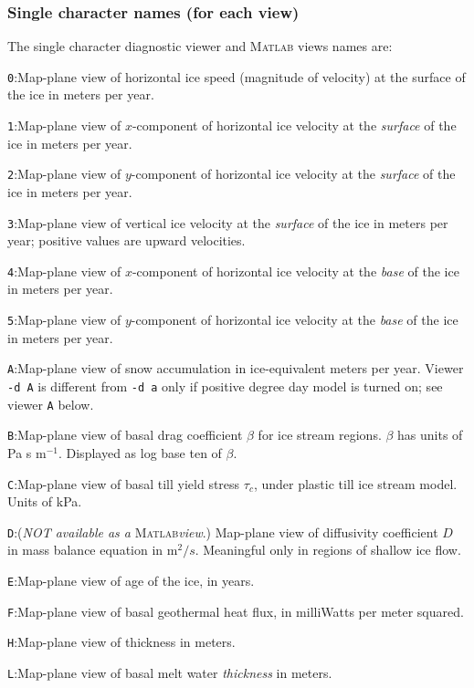 \documentclass[11pt,final]{amsart}
\newcommand{\Matlab}{\textsc{Matlab}\xspace}
\begin{document}
\subsubsection*{Single character names (for each view)}  The single character diagnostic viewer and \Matlab views names are:
\newcommand{\notMat}{(\emph{NOT available as a} \Matlab \emph{view}.)\xspace\xspace}

\verb|0|:\quad Map-plane view of horizontal ice speed (magnitude of velocity) at the surface of the ice in meters per year.

\verb|1|:\quad Map-plane view of $x$-component of horizontal ice velocity at the \emph{surface} of the ice in meters per year.

\verb|2|:\quad Map-plane view of $y$-component of horizontal ice velocity at the \emph{surface} of the ice in meters per year.

\verb|3|:\quad Map-plane view of vertical ice velocity at the \emph{surface} of the ice in meters per year; positive values are upward velocities.

\verb|4|:\quad Map-plane view of $x$-component of horizontal ice velocity at the \emph{base} of the ice in meters per year.

\verb|5|:\quad Map-plane view of $y$-component of horizontal ice velocity at the \emph{base} of the ice in meters per year.

\verb|A|:\quad Map-plane view of snow accumulation in ice-equivalent meters per year.  Viewer \verb|-d A| is different from \verb|-d a| only if positive degree day model is turned on; see viewer \verb|A| below.

\verb|B|:\quad Map-plane view of basal drag coefficient $\beta$ for ice stream regions.  $\beta$ has units of Pa s $\text{m}^{-1}$.  Displayed as log base ten of $\beta$.

\verb|C|:\quad Map-plane view of basal till yield stress $\tau_c$, under plastic till ice stream model.  Units of kPa.

\verb|D|:\quad \notMat Map-plane view of diffusivity coefficient $D$ in mass balance equation in $\text{m}^2/s$.  Meaningful only in regions of shallow ice flow.

\verb|E|:\quad Map-plane view of age of the ice, in years.

\verb|F|:\quad Map-plane view of basal geothermal heat flux, in milliWatts per meter squared.

\verb|H|:\quad Map-plane view of thickness in meters.

\verb|L|:\quad Map-plane view of basal melt water \emph{thickness} in meters.
\end{document}

